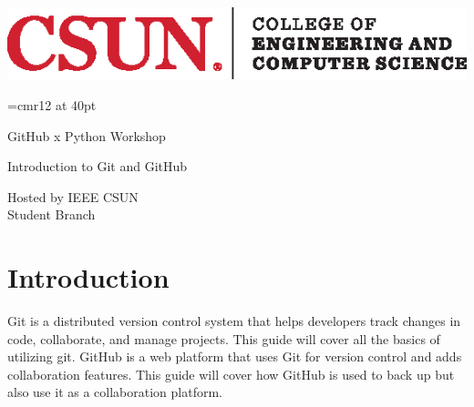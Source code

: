 \documentclass[12pt, a4paper]{article}
\begin{document}
\thispagestyle{empty}

\includegraphics[scale=2]{../images/ECS.eps}

\vspace{2in}
\font\tmpfont=cmr12 at 40pt  %
{\centering\tmpfont GitHub x Python Workshop \par}

\vskip30pt

\doublespacing
{\centering\Huge Introduction to Git and GitHub \par}

\vspace{3in}

\begin{flushright}	
	{\Large Hosted by IEEE CSUN\\
	Student Branch}
\end{flushright}
\singlespacing
\newpage

\doublespacing %
\tableofcontents
{}
\singlespacing %
\newpage

\setlength{\headheight}{40pt}
\pagestyle{fancy}

\def\tilda{\raisebox{-0.5ex}{\textasciitilde}}

\section{Introduction}
Git is a distributed version control system that helps developers track changes in code, collaborate, and manage projects. This guide will cover all the basics of utilizing git. GitHub is a web platform that uses Git for version control and adds collaboration features. This guide will cover how GitHub is used to back up but also use it as a collaboration platform.
\end{document}
